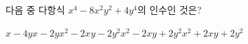 다음 중 다항식 $x^4-8x^2y^2+4y^4$의 인수인 것은?
\begin{choicesii}{$x-4y$}{$x-2y$}{$x^2-2xy-2y^2$}{$x^2-2xy+2y^2$}{$x^2+2xy+2y^2$}\end{choicesii}
